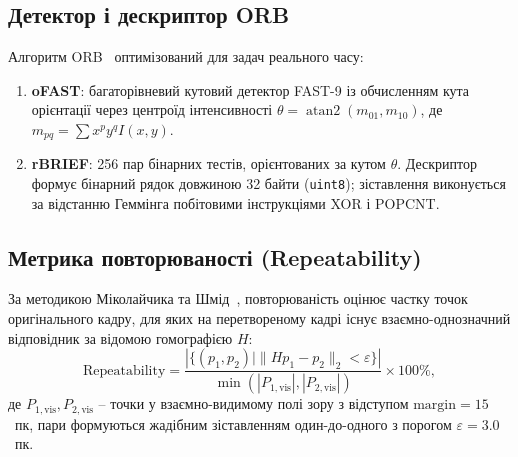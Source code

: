 \documentclass[14pt, a4paper]{extarticle}
\begin{document}
\subsection{Детектор і дескриптор ORB}
Алгоритм ORB~\cite{rublee2011orb} оптимізований для задач реального часу:
\begin{enumerate}
    \item \textbf{oFAST}: багаторівневий кутовий детектор FAST-9 із обчисленням кута орієнтації через центроїд інтенсивності $\theta = \operatorname{atan2}(m_{01}, m_{10})$, де $m_{pq} = \sum x^p y^q I(x, y)$.
    \item \textbf{rBRIEF}: 256 пар бінарних тестів, орієнтованих за кутом $\theta$. Дескриптор формує бінарний рядок довжиною 32 байти (\texttt{uint8}); зіставлення виконується за відстанню Геммінга побітовими інструкціями XOR і POPCNT.
\end{enumerate}

\subsection{Метрика повторюваності (Repeatability)}
За методикою Міколайчика та Шмід~\cite{mikolajczyk2005performance}, повторюваність оцінює частку точок оригінального кадру, для яких на перетвореному кадрі існує взаємно-однозначний відповідник за відомою гомографією $H$:
\begin{equation}
    \text{Repeatability} = \frac{|\{ (p_1, p_2) \mid \| H p_1 - p_2 \|_2 < \varepsilon \}|}{\min(|P_{1, \text{vis}}|, |P_{2, \text{vis}}|)} \times 100\%,
\end{equation}
де $P_{1, \text{vis}}, P_{2, \text{vis}}$ -- точки у взаємно-видимому полі зору з відступом $\text{margin} = 15$~пк, пари формуються жадібним зіставленням один-до-одного з порогом $\varepsilon = 3.0$~пк.
\end{document}
